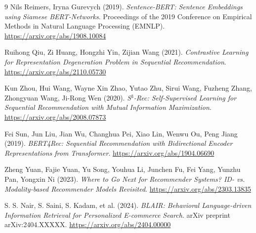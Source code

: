 \begin{thebibliography}{9}
    Nils Reimers, Iryna Gurevych (2019). 
    \textit{Sentence-BERT: Sentence Embeddings using Siamese BERT-Networks}. 
    Proceedings of the 2019 Conference on Empirical Methods in Natural Language Processing (EMNLP). \url{https://arxiv.org/abs/1908.10084}

    Ruihong Qiu, Zi Huang, Hongzhi Yin, Zijian Wang (2021). 
    \textit{Contrastive Learning for Representation Degeneration Problem in Sequential Recommendation}. 
    \url{https://arxiv.org/abs/2110.05730}

    Kun Zhou, Hui Wang, Wayne Xin Zhao, Yutao Zhu, Sirui Wang, Fuzheng Zhang, Zhongyuan Wang, Ji-Rong Wen (2020). 
    \textit{S$^3$-Rec: Self-Supervised Learning for Sequential Recommendation with Mutual Information Maximization}. 
    \url{https://arxiv.org/abs/2008.07873}

    Fei Sun, Jun Liu, Jian Wu, Changhua Pei, Xiao Lin, Wenwu Ou, Peng Jiang (2019). 
    \textit{BERT4Rec: Sequential Recommendation with Bidirectional Encoder Representations from Transformer}. 
    \url{https://arxiv.org/abs/1904.06690}

    Zheng Yuan, Fajie Yuan, Yu Song, Youhua Li, Junchen Fu, Fei Yang, Yunzhu Pan, Yongxin Ni (2023). 
    \textit{Where to Go Next for Recommender Systems? ID- vs. Modality-based Recommender Models Revisited}. 
    \url{https://arxiv.org/abs/2303.13835}
    
    S. S. Nair, S. Saini, S. Kadam, et al. (2024).
    \textit{BLAIR: Behavioral Language-driven Information Retrieval for Personalized E-commerce Search}.
    arXiv preprint arXiv:2404.XXXXX. \url{https://arxiv.org/abs/2404.00000}
    
\end{thebibliography}